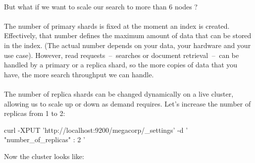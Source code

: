 \documentclass{article}%
\begin{document}
\paragraph{} But what if we want to scale our search to more than 6 nodes ?

\paragraph{} The number of primary shards is fixed at the moment an index is created. Effectively, that number defines the maximum amount of data that can be stored in the index. (The actual number depends on your data, your hardware and your use case). However, read requests  --  searches or document retrieval  --  can be handled by a primary or a replica shard, so the more copies of data that you have, the more search throughput we can handle.

\paragraph{} The number of replica shards can be changed dynamically on a live cluster, allowing us to scale up or down as demand requires. Let’s increase the number of replicas from 1 to 2:

\begin{command}
curl -XPUT 'http://localhost:9200/megacorp/_settings' -d '
{
   "number_of_replicas" : 2
}'
\end{command}

Now the cluster looks like:
\end{document}
